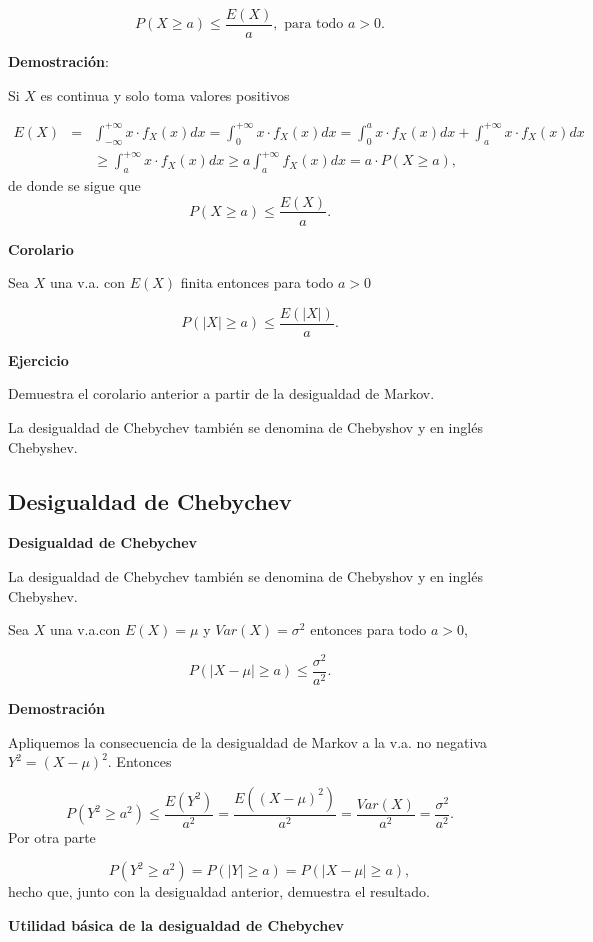 \documentclass[]{book}
\begin{document}
\[P(X\geq a)\leq \frac{E(X)}{a},\mbox{ para todo }a>0.\]

\textbf{Demostración}:

Si \(X\) es continua y solo toma valores positivos

\begin{eqnarray*}
E(X) &=& \int_{-\infty}^{+\infty} x\cdot  f_{X}(x) dx=  \int_0^{+\infty} x\cdot f_{X}(x) dx=  \int_0^{a} x\cdot  f_{X}(x) dx +\int_{a}^{+\infty} x\cdot f_{X}(x) dx \\
& &\geq   \int_{a}^{+\infty} x\cdot
f_{X}(x) dx \geq a \int_{a}^{+\infty}
f_{X}(x) dx = a \cdot  P(X\geq a),
\end{eqnarray*}
de donde se sigue que
\[P(X\geq a)\leq \frac{E(X)}{a}.\]

 \textbf{Corolario}

Sea \(X\) una v.a. con \(E(X)\) finita entonces para todo \(a>0\)

\[P(|X|\geq a )\leq \frac{E(|X|)}{a}.\]

\textbf{Ejercicio}

Demuestra el corolario anterior a partir de la desigualdad de Markov.

La desigualdad de Chebychev también se denomina de Chebyshov y en inglés Chebyshev.

\hypertarget{desigualdad-de-chebychev}{%
\subsection{Desigualdad de Chebychev}\label{desigualdad-de-chebychev}}

\textbf{Desigualdad de Chebychev}

La desigualdad de Chebychev también se denomina de Chebyshov y en inglés Chebyshev.

Sea \(X\) una v.a.con \(E(X)=\mu\) y \(Var(X)=\sigma^2\) entonces para todo \(a>0\),

\[P(|X-\mu|\geq a)\leq \frac{\sigma^2}{a^2}.\]

\textbf{Demostración}

Apliquemos la consecuencia de la desigualdad de Markov a la v.a.
no negativa \(Y^2=(X-\mu)^2\). Entonces

\[
P(Y^2\geq a^2) \leq 
\frac{E(Y^2)}{a^2}=\frac{E((X-\mu)^2)}{a^2}
= \frac{Var(X)}{a^2}=\frac{\sigma^2}{a^2}.
\]
Por otra parte

\[
P(Y^2\geq a^2)=P(|Y|\geq a)= P(|X-\mu|\geq a),
\]
hecho que, junto con la desigualdad anterior, demuestra el resultado.

 \textbf{Utilidad básica de la desigualdad de Chebychev}
\end{document}
